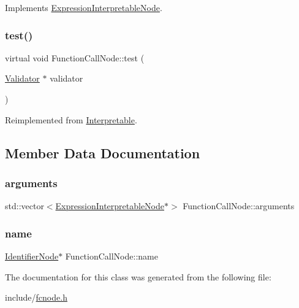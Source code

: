 Implements \hyperlink{classExpressionInterpretableNode_a43650f046c48fc539f77a207e3c9181e}{Expression\+Interpretable\+Node}.

\mbox{\label{classFunctionCallNode_a5a7f576984942e2e39057d716d8a5547}} 
\subsubsection{\texorpdfstring{test()}{test()}}
{\footnotesize\ttfamily virtual void Function\+Call\+Node\+::test (\begin{DoxyParamCaption}\item[{\hyperlink{classValidator}{Validator} $\ast$}]{validator }\end{DoxyParamCaption})\hspace{0.3cm}{\ttfamily [virtual]}}



Reimplemented from \hyperlink{classInterpretable_a32f547aaf68dcbab993284d3257ab010}{Interpretable}.



\subsection{Member Data Documentation}
\mbox{\label{classFunctionCallNode_a087579d1f0ece94640b4821830f72b55}} 
\subsubsection{\texorpdfstring{arguments}{arguments}}
{\footnotesize\ttfamily std\+::vector$<$\hyperlink{classExpressionInterpretableNode}{Expression\+Interpretable\+Node}$\ast$$>$ Function\+Call\+Node\+::arguments}

\mbox{\label{classFunctionCallNode_a03ebfc10277d6c6a7698b5eb0c02ac73}} 
\subsubsection{\texorpdfstring{name}{name}}
{\footnotesize\ttfamily \hyperlink{classIdentifierNode}{Identifier\+Node}$\ast$ Function\+Call\+Node\+::name}



The documentation for this class was generated from the following file\+:\begin{DoxyCompactItemize}
\item 
include/\hyperlink{fcnode_8h}{fcnode.\+h}\end{DoxyCompactItemize}
